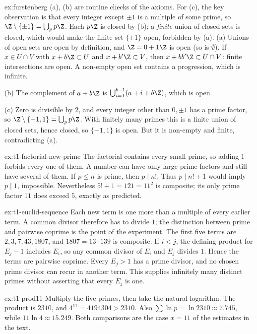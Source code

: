 \begin{solution}{ex:furstenberg}
\idea (a), (b) are routine checks of the axioms. For (c), the key observation is that every integer except $\pm1$ is a multiple of some prime, so $\Z\setminus\{\pm1\}=\bigcup_pp\Z$. Each $p\Z$ is closed by (b); a \emph{finite} union of closed sets is closed, which would make the finite set $\{\pm1\}$ open, forbidden by (a).
\writeup (a) Unions of open sets are open by definition, and $\Z=0+1\Z$ is open (so is $\emptyset$). If $x\in U\cap V$ with $x+b\Z\subset U$ and $x+b'\Z\subset V$, then $x+bb'\Z\subset U\cap V$: finite intersections are open. A non-empty open set contains a progression, which is infinite.

(b) The complement of $a+b\Z$ is $\bigcup_{i=1}^{b-1}(a+i+b\Z)$, which is open.

(c) Zero is divisible by $2$, and every integer other than $0,\pm1$ has a prime factor, so $\Z\setminus\{-1,1\}=\bigcup_pp\Z$. With finitely many primes this is a finite union of closed sets, hence closed, so $\{-1,1\}$ is open. But it is non-empty and finite, contradicting (a).
\end{solution}

\begin{solution}{ex:t1-factorial-new-prime}
\idea The factorial contains every small prime, so adding $1$ forbids every one of them. A number can have only large prime factors and still have several of them.
\writeup If $p\le n$ is prime, then $p\mid n!$. Thus $p\mid n!+1$ would imply $p\mid1$, impossible. Nevertheless $5!+1=121=11^2$ is composite; its only prime factor $11$ does exceed $5$, exactly as predicted.
\end{solution}

\begin{solution}{ex:t1-euclid-sequence}
\idea Each new term is one more than a multiple of every earlier term. A common divisor therefore has to divide $1$; the distinction between prime and pairwise coprime is the point of the experiment.
\writeup The first five terms are $2,3,7,43,1807$, and $1807=13\cdot139$ is composite. If $i<j$, the defining product for $E_j-1$ includes $E_i$, so any common divisor of $E_i$ and $E_j$ divides $1$. Hence the terms are pairwise coprime. Every $E_j>1$ has a prime divisor, and no chosen prime divisor can recur in another term. This supplies infinitely many distinct primes without asserting that every $E_j$ is one.
\end{solution}

\begin{solution}{ex:t1-prod11}
\idea Multiply the five primes, then take the natural logarithm.
\writeup The product is $2310$, and $4^{11}=4194304>2310$. Also $\sum\ln p=\ln 2310\approx 7.745$, while $11\ln 4\approx 15.249$. Both comparisons are the case $x=11$ of the estimates in the text.
\end{solution}

